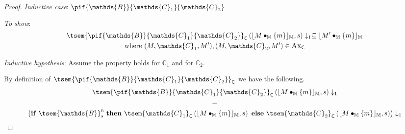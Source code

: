 {\begin{proof}
\textit{Inductive case}: $\pif{\mathds{B}}{\mathds{C}_1}{\mathds{C}_2}$

\textit{To show}:
\begin{gather*}
	\tsem{\pif{\mathds{B}}{\mathds{C}_1}{\mathds{C}_2}}_\mathsf{C} \left( \lfloor M \bullet_\mathbb{M} \{m\} \rfloor_\mathbb{M}, s \right) \downarrow_1 \subseteq \lfloor M' \bullet_\mathbb{M} \{m\} \rfloor_\mathbb{M}
	\\
	\text{where } (M, \mathds{C}_1, M'), (M, \mathds{C}_2, M') \in \textsc{Ax}_\mathsf{C}
\end{gather*}

\textit{Inductive hypothesis}: Assume the property holds for $\mathds{C}_1$ and for $\mathds{C}_2$.

By definition of $\tsem{\pif{\mathds{B}}{\mathds{C}_1}{\mathds{C}_2}}_\mathsf{C}$ we have the following.
\begin{gather*}
	\tsem{\pif{\mathds{B}}{\mathds{C}_1}{\mathds{C}_2}}_\mathsf{C} \left( \lfloor M \bullet_\mathbb{M} \{m\} \rfloor_\mathbb{M}, s \right) \downarrow_1
	\\
	=
	\\
	\left( \mathbf{if}\ \tsem{\mathds{B}}^\textsc{b}_s\ \mathbf{then}\ \tsem{\mathds{C}_1}_\mathsf{C}\left( \lfloor M \bullet_\mathbb{M} \{m\} \rfloor_\mathbb{M}, s \right)\ \mathbf{else}\ \tsem{\mathds{C}_2}_\mathsf{C}\left( \lfloor M \bullet_\mathbb{M} \{m\} \rfloor_\mathbb{M}, s \right) \right) \downarrow_1
\end{gather*}


\end{proof}}
